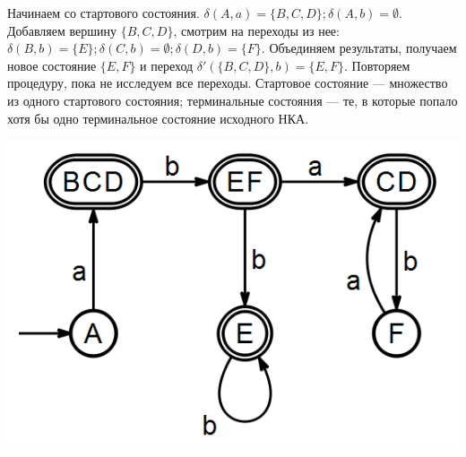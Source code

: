 \documentclass[12pt]{article}
\begin{document}
Начинаем со стартового состояния. $\delta(A, a) = \{B, C, D\}; \delta(A, b) = \emptyset$. Добавляем вершину $\{B, C, D\}$, смотрим на переходы из нее: $\delta(B, b) = \{E\}; \delta(C, b) = \emptyset; \delta(D, b) = \{ F\}$. Объединяем результаты, получаем новое состояние $\{ E, F\}$ и переход $\delta'(\{B,C,D\}, b) = \{E, F\}$. Повторяем процедуру, пока не исследуем все переходы. Стартовое состояние --- множество из одного стартового состояния; терминальные состояния --- те, в которые попало хотя бы одно терминальное состояние исходного НКА.

\includegraphics[width=0.65\linewidth]{2exdetres.png}



\end{document}
